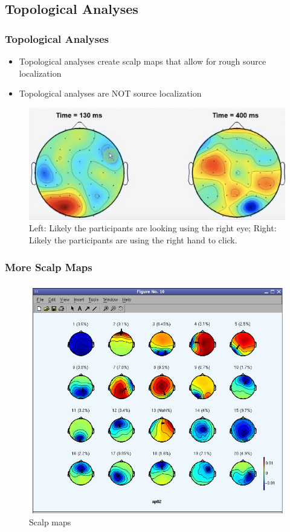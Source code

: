 \documentclass{beamer}
\begin{document}
\subsection{Topological Analyses}

\begin{frame}
\frametitle{Topological Analyses}
\begin{itemize}
	\item Topological analyses create scalp maps that allow for rough source localization
	\item Topological analyses are NOT source localization
\end{itemize}
	\begin{figure}
		\includegraphics[width=0.7\linewidth]{image/scalpmap2}
		\caption{Left: Likely the participants are looking using the right eye; Right: Likely the participants are using the right hand to click.}
	\end{figure}
\end{frame}

\begin{frame}
\frametitle{More Scalp Maps}
	\begin{figure}
		\includegraphics[width=0.5\linewidth]{image/scalpdipole}
		\caption{Scalp maps}
	\end{figure}
\end{frame}
\end{document}
